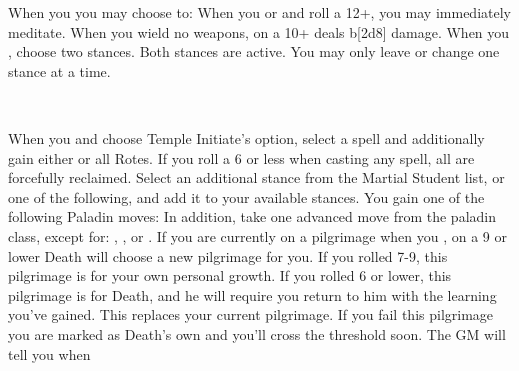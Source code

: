 \documentclass[darkmode]{dw_playbook}
\begin{document}
    {
            {When you  you may choose to:
        \gapSm
            }
        \gap
            {
            When you  or  and roll a 12+, you may immediately meditate.}
            {When you wield no weapons, on a 10+  deals b[2d8] damage.
            \gapSm
            \gapSm
            }
        \gap
            {
            When you , choose two stances.  Both stances are active.  You may only leave or change one stance at a time.}
    }

\clearpage
~

\pageThree
    {
        \advancedMovesCont
    }
    {
            {
            When you  and choose Temple Initiate's option, select a spell and additionally gain either  or all Rotes.  If you roll a 6 or less when casting any spell, all are forcefully reclaimed.}
        \gap
            {
            Select an additional stance from the Martial Student list, or one of the following, and add it to your available stances.
            \gapSm
            \gapSm
            \gapSm
            }
        \gap
            {
            You gain one of the following Paladin moves:
            \gapSm
            \gapSm
            \gapSm
            In addition, take one advanced move from the paladin class, except for: , , or .}
        \gap
            {If you are currently on a pilgrimage when you , on a 9 or lower Death will choose a new pilgrimage for you.  If you rolled 7-9, this pilgrimage is for your own personal growth.  If you rolled 6 or lower, this pilgrimage is for Death, and he will require you return to him with the learning you’ve gained.  This replaces your current pilgrimage.  If you fail this pilgrimage you are marked as Death’s own and you’ll cross the threshold soon.  The GM will tell you when}
    }
    {
        ~
    }
\end{document}
